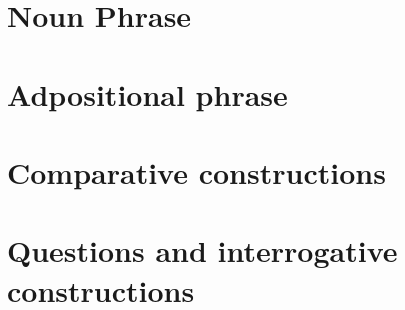 \documentclass[grammar]{subfiles}
\begin{document}
  \section{Noun Phrase}
  \label{sec:cot_noun_phrase}

  \section{Adpositional phrase}
  \label{sec:cot_adpositional_phrase}

  \section{Comparative constructions}
  \label{sec:cot_comparative_constructions}

  \section{Questions and interrogative constructions}
  \label{sec:cot_questions}
\end{document}
